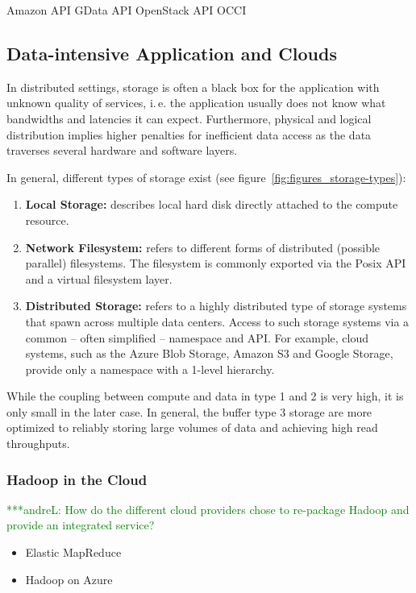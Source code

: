 \documentclass[times]{cpeauth}
\newcommand{\alnote}[1]{ {\textcolor{green} { ***andreL: #1 }}}
\newcommand{\alnote}[1]{}
\begin{document}
Amazon API
GData API
OpenStack API
OCCI



\subsection{Data-intensive Application and Clouds}

In distributed settings, storage is often a black box for the application with
unknown quality of services, i.\,e. the application usually does not know what
bandwidths and latencies it can expect. Furthermore, physical and logical
distribution implies higher penalties for inefficient data access as the data
traverses several hardware and software layers.

In general, different types of storage exist (see figure~\ref{fig:figures_storage-types}):

\begin{enumerate}
	\item \textbf{Local Storage:} describes local hard disk directly attached 
	to the compute resource.
	\item \textbf{Network Filesystem:} refers to different forms of 
	distributed (possible parallel) filesystems. The filesystem is commonly 
	exported via the Posix API and a virtual filesystem layer.
	\item \textbf{Distributed Storage:} refers to a highly distributed type of 
	storage systems that spawn across multiple data centers. Access to such 
	storage systems via a common -- often simplified -- namespace and API. For 
	example, cloud systems, such as the Azure Blob Storage, Amazon S3 and 
	Google Storage, provide only a namespace with a 1-level hierarchy. 
\end{enumerate}

While the coupling between compute and data in type 1 and 2 is very high, it 
is only small in the later case. In general, the buffer type 3 storage are 
more optimized to reliably storing large volumes of data and achieving high
read throughputs.

\subsubsection{Hadoop in the Cloud}

\alnote{How do the different cloud providers chose to re-package Hadoop and 
provide an integrated service?}

\begin{itemize}
	\item Elastic MapReduce
	\item Hadoop on Azure
\end{itemize}
\end{document}
